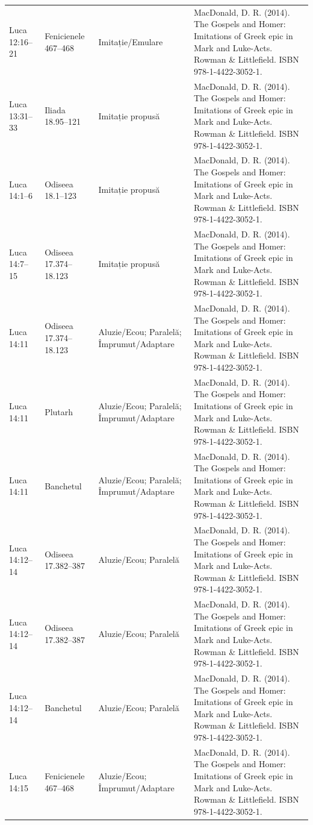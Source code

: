 \documentclass[12pt,a4paper,twoside,openany]{book}
\begin{document}
\begin{longtable}{L{1.4cm}L{1.7cm}L{3.1cm}L{8.4cm}}
Luca 12:16–21 & Fenicienele 467–468 & Imitație/Emulare & MacDonald, D. R. (2014). The Gospels and Homer: Imitations of Greek epic in Mark and Luke-Acts. Rowman \& Littlefield. ISBN 978-1-4422-3052-1. \\
Luca 13:31–33 & Iliada 18.95–121 & Imitație propusă & MacDonald, D. R. (2014). The Gospels and Homer: Imitations of Greek epic in Mark and Luke-Acts. Rowman \& Littlefield. ISBN 978-1-4422-3052-1. \\
Luca 14:1–6 & Odiseea 18.1–123 & Imitație propusă & MacDonald, D. R. (2014). The Gospels and Homer: Imitations of Greek epic in Mark and Luke-Acts. Rowman \& Littlefield. ISBN 978-1-4422-3052-1. \\
Luca 14:7–15 & Odiseea 17.374–18.123 & Imitație propusă & MacDonald, D. R. (2014). The Gospels and Homer: Imitations of Greek epic in Mark and Luke-Acts. Rowman \& Littlefield. ISBN 978-1-4422-3052-1. \\
Luca 14:11 & Odiseea 17.374–18.123 & Aluzie/Ecou; Paralelă; Împrumut/Adaptare & MacDonald, D. R. (2014). The Gospels and Homer: Imitations of Greek epic in Mark and Luke-Acts. Rowman \& Littlefield. ISBN 978-1-4422-3052-1. \\
Luca 14:11 & Plutarh & Aluzie/Ecou; Paralelă; Împrumut/Adaptare & MacDonald, D. R. (2014). The Gospels and Homer: Imitations of Greek epic in Mark and Luke-Acts. Rowman \& Littlefield. ISBN 978-1-4422-3052-1. \\
Luca 14:11 & Banchetul & Aluzie/Ecou; Paralelă; Împrumut/Adaptare & MacDonald, D. R. (2014). The Gospels and Homer: Imitations of Greek epic in Mark and Luke-Acts. Rowman \& Littlefield. ISBN 978-1-4422-3052-1. \\
Luca 14:12–14 & Odiseea 17.382–387 & Aluzie/Ecou; Paralelă & MacDonald, D. R. (2014). The Gospels and Homer: Imitations of Greek epic in Mark and Luke-Acts. Rowman \& Littlefield. ISBN 978-1-4422-3052-1. \\
Luca 14:12–14 & Odiseea 17.382–387 & Aluzie/Ecou; Paralelă & MacDonald, D. R. (2014). The Gospels and Homer: Imitations of Greek epic in Mark and Luke-Acts. Rowman \& Littlefield. ISBN 978-1-4422-3052-1. \\
Luca 14:12–14 & Banchetul & Aluzie/Ecou; Paralelă & MacDonald, D. R. (2014). The Gospels and Homer: Imitations of Greek epic in Mark and Luke-Acts. Rowman \& Littlefield. ISBN 978-1-4422-3052-1. \\
Luca 14:15 & Fenicienele 467–468 & Aluzie/Ecou; Împrumut/Adaptare & MacDonald, D. R. (2014). The Gospels and Homer: Imitations of Greek epic in Mark and Luke-Acts. Rowman \& Littlefield. ISBN 978-1-4422-3052-1. \\

\end{longtable}
\end{document}
